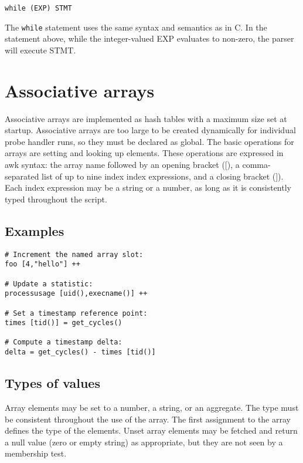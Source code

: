 \documentclass[twoside,english]{article}
\newenvironment{vindent}
{\begin{list}{}{\setlength{\listparindent}{6pt}}
\item[]}
{\end{list}}
\begin{document}
\begin{vindent}
\begin{verbatim}
while (EXP) STMT
\end{verbatim}
\end{vindent}
The \texttt{while} statement uses the same syntax and semantics as in C.
In the statement above, while the integer-valued EXP evaluates to non-zero,
the parser will execute STMT.


\section{Associative arrays\label{sec:Associative-Arrays}}
Associative arrays are implemented as hash tables with a maximum size set
at startup. Associative arrays are too large to be created dynamically for
individual probe handler runs, so they must be declared as global. The basic
operations for arrays are setting and looking up elements. These operations
are expressed in awk syntax: the array name followed by an opening bracket
({[}), a comma-separated list of up to nine index index expressions, and
a closing bracket (]). Each index expression may be a string or a number,
as long as it is consistently typed throughout the script.


\subsection{Examples}

\begin{vindent}
\begin{verbatim}
# Increment the named array slot:
foo [4,"hello"] ++

# Update a statistic:
processusage [uid(),execname()] ++

# Set a timestamp reference point:
times [tid()] = get_cycles()

# Compute a timestamp delta:
delta = get_cycles() - times [tid()]
\end{verbatim}
\end{vindent}

\subsection{Types of values}

Array elements may be set to a number, a string, or an aggregate.
The type must be consistent
throughout the use of the array. The first assignment to the array defines
the type of the elements. Unset array elements may be fetched and return
a null value (zero or empty string) as appropriate, but they are not seen
by a membership test.
\end{document}
